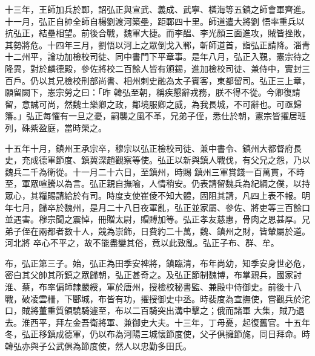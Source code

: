 \begin{pinyinscope}
 十三年，王師加兵於鄆，詔弘正與宣武、義成、武寧、橫海等五鎮之師會軍齊進。十一月，弘正自帥全師自楊劉渡河築壘，距鄆四十里。師道遣大將劉
 悟率重兵以抗弘正，結壘相望。前後合戰，魏軍大捷。而李醖、李光顏三面進攻，賊皆挫敗，其勢將危。十四年三月，劉悟以河上之眾倒戈入鄆，斬師道首，詣弘正請降。淄青十二州平，論功加檢校司徒、同中書門下平章事。是年八月，弘正入覲，憲宗待之隆異，對於麟德殿，參佐將校二百餘人皆有頒錫，進加檢校司徒、兼侍中，實封三百戶。仍以其兄檢校刑部尚書、相州刺史融為太子賓客，東都留司。弘正三上章，願留闕下，憲宗勞之曰：「昨
 韓弘至朝，稱疾懇辭戎務，朕不得不從。今卿復請留，意誠可尚，然魏土樂卿之政，鄰境服卿之威，為我長城，不可辭也。可亟歸籓。」弘正每懼有一旦之憂，嗣襲之風不革，兄弟子侄，悉仕於朝，憲宗皆擢居班列，硃紫盈庭，當時榮之。



 十五年十月，鎮州王承宗卒，穆宗以弘正檢校司徒、兼中書令、鎮州大都督府長史，充成德軍節度、鎮冀深趙觀察等使。弘正以新與鎮人戰伐，有父兄之怨，乃以魏兵二千為衛從。十一月二十六日，至鎮州，時賜
 鎮州三軍賞錢一百萬貫，不時至，軍眾喧騰以為言。弘正親自撫喻，人情稍安。仍表請留魏兵為紀綱之僕，以持眾心，其糧賜請給於有司。時度支使崔倰不知大體，固阻其請，凡四上表不報。明年七月，歸卒於魏州，是月二十八日夜軍亂，弘正並家屬、參佐、將吏等三百餘口並遇害。穆宗聞之震悼，冊贈太尉，賵賻加等。弘正孝友慈惠，骨肉之恩甚厚。兄弟子侄在兩都者數十人，競為崇飾，日費約二十萬，魏、鎮州之財，皆輦屬於道。河北將
 卒心不平之，故不能盡變其俗，竟以此致亂。弘正子布、群、牟。



 布，弘正第三子。始，弘正為田季安裨將，鎮臨清，布年尚幼，知季安身世必危，密白其父帥其所鎮之眾歸朝，弘正甚奇之。及弘正節制魏博，布掌親兵，國家討淮、蔡，布率偏師隸嚴綬，軍於唐州，授檢校秘書監、兼殿中侍御史。前後十八戰，破凌雲柵，下郾城，布皆有功，擢授御史中丞。時裴度為宣撫使，嘗觀兵於沱口，賊將董重質領驍騎遽至，布以二百騎突出溝中擊之；俄而諸軍
 大集，賊乃退去。淮西平，拜左金吾衛將軍、兼御史大夫。十三年，丁母憂，起復舊官。十五年冬，弘正移鎮成德軍，仍以布為河陽三城懷節度使，父子俱擁節旄，同日拜命。時韓弘亦與子公武俱為節度使，然人以忠勤多田氏。




\end{pinyinscope}
